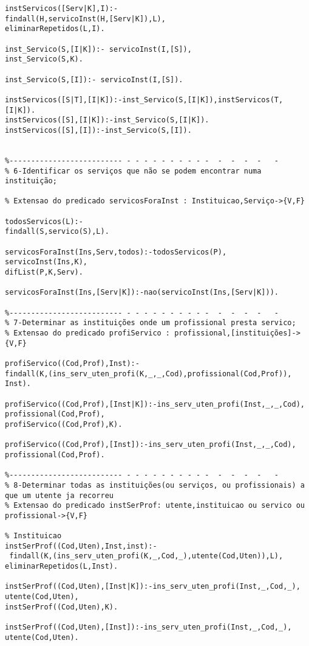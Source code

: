 \documentclass[pdftex,12pt,a4paper]{report}
\begin{document}
\begin{appendices}
\begin{Verbatim}
instServicos([Serv|K],I):-    
findall(H,servicoInst(H,[Serv|K]),L),
eliminarRepetidos(L,I).

inst_Servico(S,[I|K]):- servicoInst(I,[S]),
inst_Servico(S,K).  

inst_Servico(S,[I]):- servicoInst(I,[S]).

instServicos([S|T],[I|K]):-inst_Servico(S,[I|K]),instServicos(T,[I|K]).
instServicos([S],[I|K]):-inst_Servico(S,[I|K]).
instServicos([S],[I]):-inst_Servico(S,[I]).


%-------------------------- - - - - - - - - - -  -  -  -  -   -         
% 6-Identificar os serviços que não se podem encontrar numa instituição;

% Extensao do predicado servicosForaInst : Instituicao,Serviço->{V,F}

todosServicos(L):-
findall(S,servico(S),L).

servicosForaInst(Ins,Serv,todos):-todosServicos(P), 
servicoInst(Ins,K),
difList(P,K,Serv).

servicosForaInst(Ins,[Serv|K]):-nao(servicoInst(Ins,[Serv|K])).

%-------------------------- - - - - - - - - - -  -  -  -  -   -         
% 7-Determinar as instituições onde um profissional presta servico;
% Extensao do predicado profiServico : profissional,[instituições]->{V,F}

profiServico((Cod,Prof),Inst):- 
findall(K,(ins_serv_uten_profi(K,_,_,Cod),profissional(Cod,Prof)),
Inst).

profiServico((Cod,Prof),[Inst|K]):-ins_serv_uten_profi(Inst,_,_,Cod),
profissional(Cod,Prof),
profiServico((Cod,Prof),K).

profiServico((Cod,Prof),[Inst]):-ins_serv_uten_profi(Inst,_,_,Cod),
profissional(Cod,Prof).

%-------------------------- - - - - - - - - - -  -  -  -  -   -         
% 8-Determinar todas as instituições(ou serviços, ou profissionais) a que um utente ja recorreu
% Extensao do predicado instSerProf: utente,instituicao ou servico ou profissional->{V,F}

% Instituicao
instSerProf((Cod,Uten),Inst,inst):-
 findall(K,(ins_serv_uten_profi(K,_,Cod,_),utente(Cod,Uten)),L),
eliminarRepetidos(L,Inst).

instSerProf((Cod,Uten),[Inst|K]):-ins_serv_uten_profi(Inst,_,Cod,_),
utente(Cod,Uten),
instSerProf((Cod,Uten),K).

instSerProf((Cod,Uten),[Inst]):-ins_serv_uten_profi(Inst,_,Cod,_),
utente(Cod,Uten).



\end{Verbatim}
\end{appendices}
\end{document}
